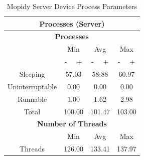 \documentclass[11pt,a4paper]{scrreprt}
\begin{document}
\begin{table}[H]
\centering
    \begin{tabular}{||c|c|c|c|c|c|c||}
    \hline
    \multicolumn{7}{|c|}{\textbf{Processes (Server)}} \\
    \hline
    \multicolumn{7}{|c|}{\textbf{Processes}} \\
    \hline\hline
      & \multicolumn{2}{|c|}{Min} & \multicolumn{2}{|c|}{Avg} & \multicolumn{2}{|c|}{Max} \\
    \hline
      & - & + & - & + & - & + \\
    \hline
    Sleeping & \multicolumn{2}{|c|}{57.03} & \multicolumn{2}{|c|}{58.88} & \multicolumn{2}{|c|}{60.97} \\
    \hline
    Uninterruptable & \multicolumn{2}{|c|}{0.00} & \multicolumn{2}{|c|}{0.00} & \multicolumn{2}{|c|}{0.00} \\
    \hline
    Runnable & \multicolumn{2}{|c|}{1.00} & \multicolumn{2}{|c|}{1.62} & \multicolumn{2}{|c|}{2.98} \\
    \hline
    Total & \multicolumn{2}{|c|}{100.00} & \multicolumn{2}{|c|}{101.47} & \multicolumn{2}{|c|}{103.00} \\
    \hline\hline
    \multicolumn{7}{|c|}{\textbf{Number of Threads}} \\
    \hline\hline
      & \multicolumn{2}{|c|}{Min} & \multicolumn{2}{|c|}{Avg} & \multicolumn{2}{|c|}{Max} \\
    \hline
    Threads  & \multicolumn{2}{|c|}{126.00} & \multicolumn{2}{|c|}{133.41} & \multicolumn{2}{|c|}{137.97} \\
    \hline\hline
    \end{tabular}
    \caption{Mopidy Server Device Process Parameters}
    \label{MopidyserverProcessTab}
\end{table}
\end{document}
